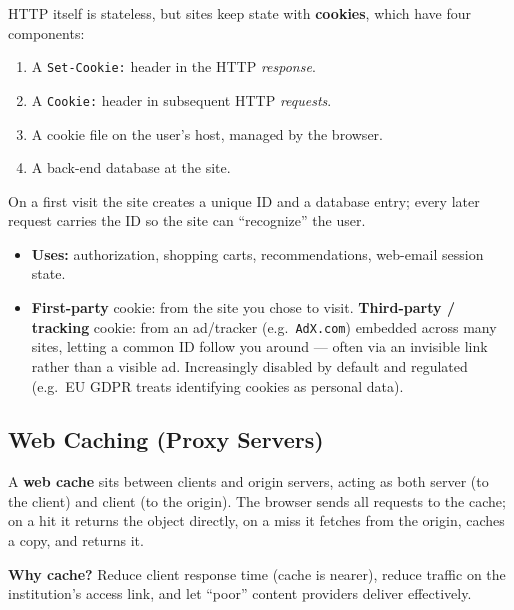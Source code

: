 \documentclass[hidelinks]{article}
\begin{document}
HTTP itself is stateless, but sites keep state with \textbf{cookies}, which
have four components:
\begin{enumerate}
    \item A \texttt{Set-Cookie:} header in the HTTP \emph{response}.
    \item A \texttt{Cookie:} header in subsequent HTTP \emph{requests}.
    \item A cookie file on the user's host, managed by the browser.
    \item A back-end database at the site.
\end{enumerate}
On a first visit the site creates a unique ID and a database entry; every
later request carries the ID so the site can ``recognize'' the user.

\begin{itemize}
    \item \textbf{Uses:} authorization, shopping carts, recommendations,
    web-email session state.
    \item \textbf{First-party} cookie: from the site you chose to visit.
    \textbf{Third-party / tracking} cookie: from an ad/tracker
    (e.g.\ \texttt{AdX.com}) embedded across many sites, letting a common ID
    follow you around --- often via an invisible link rather than a visible
    ad. Increasingly disabled by default and regulated (e.g.\ EU GDPR treats
    identifying cookies as personal data).
\end{itemize}

\subsection{Web Caching (Proxy Servers)}

A \textbf{web cache} sits between clients and origin servers, acting as both
server (to the client) and client (to the origin). The browser sends all
requests to the cache; on a hit it returns the object directly, on a miss it
fetches from the origin, caches a copy, and returns it.

\textbf{Why cache?} Reduce client response time (cache is nearer), reduce
traffic on the institution's access link, and let ``poor'' content providers
deliver effectively.
\end{document}
